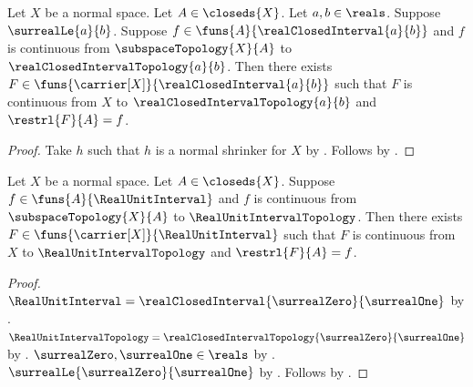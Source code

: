 \begin{theorem}\label{tietze_extension_closed_interval}
    Let $X$ be a normal space.
    Let $A\in\closeds{X}$.
    Let $a,b\in\reals$.
    Suppose $\surrealLe{a}{b}$.
    Suppose $f\in\funs{A}{\realClosedInterval{a}{b}}$ and
        $f$ is continuous from $\subspaceTopology{X}{A}$ to
            $\realClosedIntervalTopology{a}{b}$.
    Then there exists
        $F\in\funs{\carrier[X]}{\realClosedInterval{a}{b}}$ such that
        $F$ is continuous from $X$ to
            $\realClosedIntervalTopology{a}{b}$ and
        $\restrl{F}{A}=f$.
\end{theorem}
\begin{proof}
    Take $h$ such that $h$ is a normal shrinker for $X$
        by .
    Follows by
        .
\end{proof}

\begin{theorem}\label{tietze_extension_unit_interval}
    Let $X$ be a normal space.
    Let $A\in\closeds{X}$.
    Suppose $f\in\funs{A}{\RealUnitInterval}$ and
        $f$ is continuous from $\subspaceTopology{X}{A}$ to
            $\RealUnitIntervalTopology$.
    Then there exists
        $F\in\funs{\carrier[X]}{\RealUnitInterval}$ such that
        $F$ is continuous from $X$ to $\RealUnitIntervalTopology$ and
        $\restrl{F}{A}=f$.
\end{theorem}
\begin{proof}
    $\RealUnitInterval=
        \realClosedInterval{\surrealZero}{\surrealOne}$
        by .
    $\RealUnitIntervalTopology=
        \realClosedIntervalTopology{\surrealZero}{\surrealOne}$
        by
        .
    $\surrealZero,\surrealOne\in\reals$
        by .
    $\surrealLe{\surrealZero}{\surrealOne}$
        by .
    Follows by .
\end{proof}
